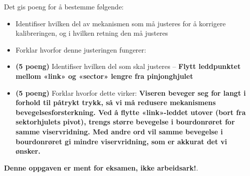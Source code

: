 \noindent
Det gis poeng for å bestemme følgende:

\begin{itemize}
\item{} Identifiser hvilken del av mekanismen som må justeres for å korrigere kalibreringen, og i hvilken retning den må justeres
\vskip 5pt
\item{} Forklar hvorfor denne justeringen fungerer:
\end{itemize}







\begin{itemize}
\item{} {\bf (5 poeng)} Identifiser hvilken del som skal justeres -- {\bf Flytt leddpunktet mellom «link» og «sector» lengre fra pinjonghjulet}
\vskip 5pt
\item{} {\bf (5 poeng)} Forklar hvorfor dette virker: {\bf Viseren beveger seg for langt i forhold til påtrykt trykk, så vi må redusere mekanismens bevegelsesforsterkning. Ved å flytte «link»-leddet utover (bort fra sektorhjulets pivot), trengs større bevegelse i bourdonrøret for samme viservridning. Med andre ord vil samme bevegelse i bourdonrøret gi mindre viservridning, som er akkurat det vi ønsker.}
\end{itemize}







{\bf Denne oppgaven er ment for eksamen, ikke arbeidsark!}.

